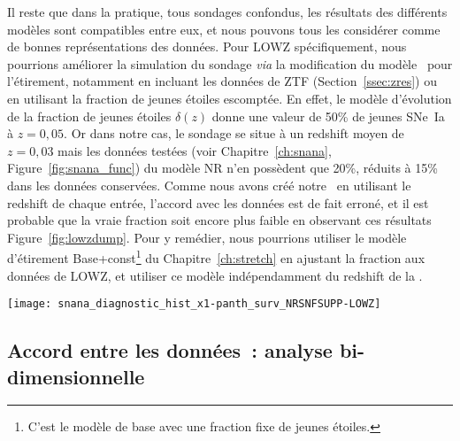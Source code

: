 \documentclass[../main/main.tex]{subfiles}
\begin{document}
Il reste que dans la pratique, tous sondages confondus, les résultats des
différents modèles sont compatibles entre eux, et nous pouvons tous les
considérer comme de bonnes représentations des données. Pour LOWZ
spécifiquement, nous pourrions améliorer la simulation du sondage \textit{via}
la modification du modèle~ pour l'étirement, notamment
en incluant les données de ZTF (Section~\ref{ssec:zres}) ou en utilisant la
fraction de jeunes étoiles escomptée. En effet, le modèle d'évolution de la
fraction de jeunes étoiles $\delta(z)$ donne une valeur de 50\% de jeunes SNe~Ia
à $z = 0,05$. Or dans notre cas, le sondage se situe à un redshift moyen de $z =
0,03$ mais les données testées (voir Chapitre~\ref{ch:snana},
Figure~\ref{fig:snana_func}) du modèle NR n'en possèdent que 20\%, réduits à
15\% dans les données conservées. Comme nous avons créé notre \hostlib\ en
utilisant le redshift de chaque entrée, l'accord avec les données est de fait
erroné, et il est probable que la vraie fraction soit encore plus faible en
observant ces résultats Figure~\ref{fig:lowzdump}. Pour y remédier, nous
pourrions utiliser le modèle d'étirement Base+const\footnote{C'est le modèle de
base avec une fraction fixe de jeunes étoiles.} du Chapitre~\ref{ch:stretch} en
ajustant la fraction aux données de LOWZ, et utiliser ce modèle indépendamment
du redshift de la \hostlib.

\begin{SCfigure}[1][ht]
    \centering
    \texttt{[image: snana\_diagnostic\_hist\_x1-panth\_surv\_NRSNFSUPP-LOWZ]}
    \caption[Histogrammes des données testées et conservées du modèle NR pour le
    sondage LOWZ]{Histogrammes des étirements des données de LOWZ~:\textit{en
        rouge} celles de Pantheon~; \textit{en violet} les données testées et
        \textit{en orange} les données conservées pour le modèle NR. Le
        modèle~ évalué aux fractions des jeunes SNe~Ia
        pour ces deux échantillons sont tracés en marqueurs de la couleur
        correspondante~; le modèle évalué au redshift moyen de la distribution
        est tracé en marqueurs noirs. Les parties vieilles des données testées
    et conservées sont en pointillés.}
    \label{fig:lowzdump}
\end{SCfigure}

\subsection{Accord entre les données~: analyse
bi-dimensionnelle}\label{ssec:comp2d}
\end{document}
